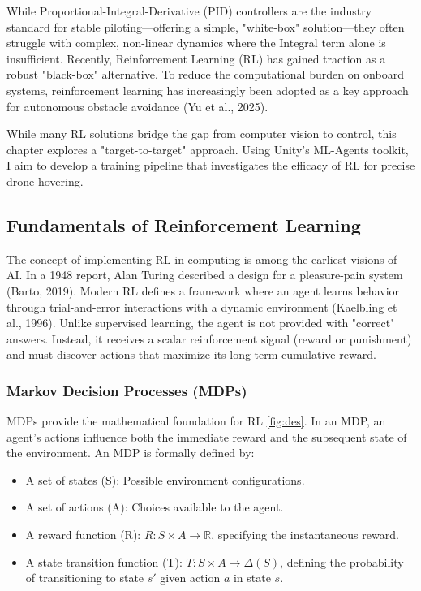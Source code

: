 While Proportional-Integral-Derivative (PID) controllers are the industry standard for stable piloting—offering a simple, "white-box" solution—they often struggle with complex, non-linear dynamics where the Integral term alone is insufficient. Recently, Reinforcement Learning (RL) has gained traction as a robust "black-box" alternative. To reduce the computational burden on onboard systems, reinforcement learning has increasingly been adopted as a key approach for autonomous obstacle avoidance (Yu et al., 2025).

While many RL solutions bridge the gap from computer vision to control, this chapter explores a "target-to-target" approach. Using Unity’s ML-Agents toolkit, I aim to develop a training pipeline that investigates the efficacy of RL for precise drone hovering.

\subsection{Fundamentals of Reinforcement Learning}

The concept of implementing RL in computing is among the earliest visions of AI. In a 1948 report, Alan Turing described a design for a pleasure-pain system (Barto, 2019). Modern RL defines a framework where an agent learns behavior through trial-and-error interactions with a dynamic environment (Kaelbling et al., 1996). Unlike supervised learning, the agent is not provided with "correct" answers. Instead, it receives a scalar reinforcement signal (reward or punishment) and must discover actions that maximize its long-term cumulative reward.

\subsubsection{Markov Decision Processes (MDPs)}

MDPs provide the mathematical foundation for RL \cref{fig:des}. In an MDP, an agent’s actions influence both the immediate reward and the subsequent state of the environment. An MDP is formally defined by:

\begin{itemize}
    \item A set of states (S): Possible environment configurations.
    \item A set of actions (A): Choices available to the agent.
    \item A reward function (R): $R: S \times A \to \mathbb{R}$, specifying the instantaneous reward.
    \item A state transition function (T): $T: S \times A \to \Delta(S)$, defining the probability of transitioning to state $s'$ given action $a$ in state $s$.
\end{itemize}

